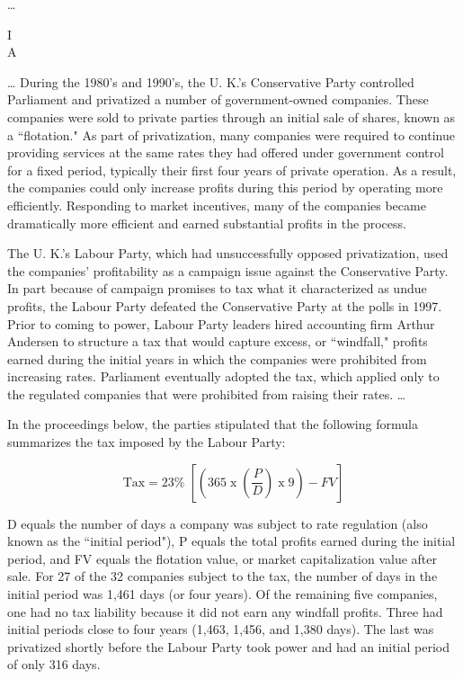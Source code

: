 \begin{select}


\ldots 


\begin{center}
 I \\
 A
\end{center}

\ldots 
During the 1980's and 1990's, the U. K.'s Conservative Party controlled Parliament and privatized a number of government-owned companies. These companies were sold to private parties through an initial sale of shares, known as a ``flotation." As part of privatization, many companies were required to continue providing services at the same rates they had offered under government control for a fixed period, typically their first four years of private operation. As a result, the companies could only increase profits during this period by operating more efficiently. Responding to market incentives, many of the companies became dramatically more efficient and earned substantial profits in the process.

The U. K.'s Labour Party, which had unsuccessfully opposed privatization, used the companies' profitability as a campaign issue against the Conservative Party. In part because of campaign promises to tax what it characterized as undue profits, the Labour Party defeated the Conservative Party at the polls in 1997. Prior to coming to power, Labour Party leaders hired accounting firm Arthur Andersen to structure a tax that would capture excess, or ``windfall," profits earned during the initial years in which the companies were prohibited from increasing rates. Parliament eventually adopted the tax, which applied only to the regulated companies that were prohibited from raising their rates. \ldots 

In the proceedings below, the parties stipulated that the following formula summarizes the tax imposed by the Labour Party: 

\begin{displaymath}
 \textrm{Tax} = 23\%\;  [ (365\; \textrm{x}\;  (\frac{P}{D}) \; \textrm{x}\; 9)-FV]
 \end{displaymath}


D equals the number of days a company was subject to rate regulation (also known as the ``initial period"), P equals the total profits earned during the initial period, and FV equals the flotation value, or market capitalization value after sale. For 27 of the 32 companies subject to the tax, the number of days in the initial period was 1,461 days (or four years). Of the remaining five companies, one had no tax liability because it did not earn any windfall profits. Three had initial periods close to four years (1,463, 1,456, and 1,380 days). The last was privatized shortly before the Labour Party took power and had an initial period of only 316 days.


\end{select}
